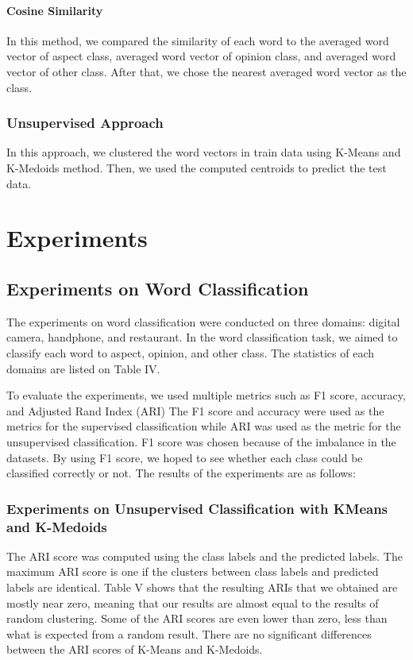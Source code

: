 \documentclass[a4paper,conference]{IEEEtran}
\begin{document}
\paragraph{Cosine Similarity}
In this method, we compared the similarity of each word to the averaged word vector of aspect class, averaged word vector of opinion class, and averaged word vector of other class. After that, we chose the nearest averaged word vector as the class.

\subsubsection{Unsupervised Approach}
In this approach, we clustered the word vectors in train data using K-Means and K-Medoids method. Then, we used the computed centroids to predict the test data.

\section{Experiments}

\subsection{Experiments on Word Classification}
The experiments on word classification were conducted on three domains: digital camera, handphone, and restaurant. In the word classification task, we aimed to classify each word to aspect, opinion, and other class. The statistics of each domains are listed on Table IV. 

To evaluate the experiments, we used multiple metrics such as F1 score, accuracy, and Adjusted Rand Index (ARI) The F1 score and accuracy were used as the metrics for the supervised classification while ARI was used as the metric for the unsupervised classification. F1 score was chosen because of the imbalance in the datasets. By using F1 score, we hoped to see whether each class could be classified correctly or not. The results of the experiments are as follows:

\subsubsection{Experiments on Unsupervised Classification with KMeans and K-Medoids}
The ARI score was computed using the class labels and the predicted labels. The maximum ARI score is one if the clusters between class labels and predicted labels are identical. Table V shows that the resulting ARIs that we obtained are mostly near zero, meaning that our results are almost equal to the results of random clustering. Some of the ARI scores are even lower than zero, less than what is expected from a random result. There are no significant differences between the ARI scores of K-Means and K-Medoids.
\end{document}
